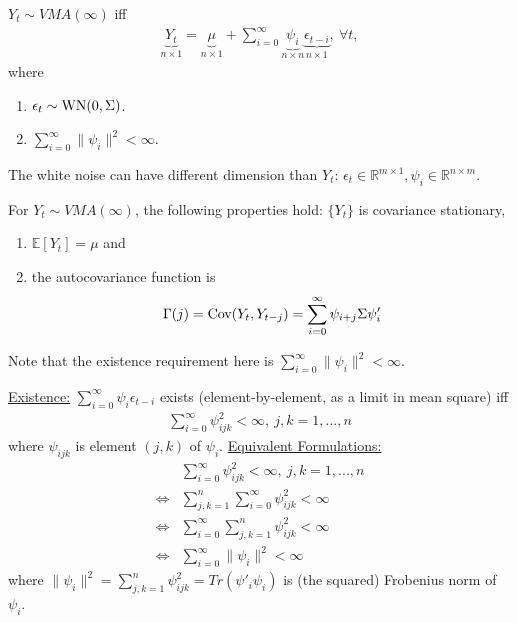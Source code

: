 \documentclass[11pt]{elegantbook}
\begin{document}
\begin{definition}
    $Y_t\sim VMA(\infty)$ iff
    \begin{equation}
        \begin{aligned}
            \underbrace{Y_t}_{n\times 1}=\underbrace{\mu}_{n\times 1}+\sum_{i=0}^{\infty}\underbrace{\psi_i}_{n\times n}\underbrace{\epsilon_{t-i}}_{n\times 1},\ \forall t,
        \end{aligned}
        \nonumber
    \end{equation}
    where
    \begin{enumerate}[$\cdot$]
        \item $\epsilon_t\sim \textnormal{WN}(0,\Sigma)$.
        \item $\sum_{i=0}^\infty\|\psi_i\|^2<\infty$.
    \end{enumerate}
    \begin{note}
        The white noise can have different dimension than $Y_t$: $\epsilon_t\in \mathbb{R}^{m\times 1},\psi_i\in \mathbb{R}^{n\times m}$.
    \end{note}
\end{definition}
\begin{lemma}
    For $Y_t\sim VMA(\infty)$, the following properties hold: $\{Y_t\}$ is covariance stationary,
    \begin{enumerate}
        \item $\mathbb{E}[Y_t]=\mu$ and
        \item the autocovariance function is $$\Gamma(j)=\textnormal{Cov}(Y_t,Y_{t-j})=\sum_{i=0}^\infty\psi_{i+j}\Sigma\psi_{i}'$$
    \end{enumerate}
\end{lemma}
Note that the existence requirement here is $\sum_{i=0}^\infty\|\psi_i\|^2<\infty$.

\underline{Existence:} $\sum_{i=0}^\infty\psi_i\epsilon_{t-i}$ exists (element-by-element, as a limit in mean square) iff
    \begin{equation}
        \begin{aligned}
            \sum_{i=0}^\infty\psi_{ijk}^2<\infty,\ j,k=1,...,n
        \end{aligned}
        \nonumber
    \end{equation}
    where $\psi_{ijk}$ is element $(j,k)$ of $\psi_i$.
\underline{Equivalent Formulations:}
\begin{equation}
    \begin{aligned}
        &\sum_{i=0}^\infty\psi_{ijk}^2<\infty,\ j,k=1,...,n\\
        \Leftrightarrow & \sum_{j,k=1}^n \sum_{i=0}^\infty\psi_{ijk}^2<\infty\\
        \Leftrightarrow & \sum_{i=0}^\infty\sum_{j,k=1}^n\psi_{ijk}^2<\infty\\
        \Leftrightarrow & \sum_{i=0}^\infty\|\psi_i\|^2<\infty
    \end{aligned}
    \nonumber
\end{equation}
where $\|\psi_i\|^2=\sum_{j,k=1}^n\psi_{ijk}^2=Tr(\psi'_i\psi_i)$ is (the squared) Frobenius norm of $\psi_i$.
\end{document}
